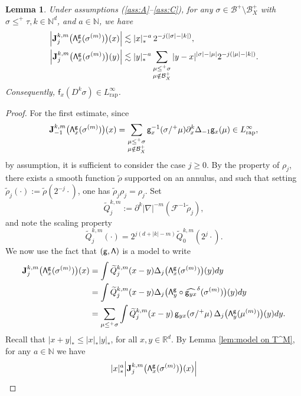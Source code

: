 \documentclass[10pt]{amsart}
\theoremstyle{plain}
\newtheorem{lem}[thm]{Lemma}
\theoremstyle{definition}
\newcommand{\rap}{\mathrm{rap}}
\newcommand{\bfJ}{\mathbf{J}}
\newcommand{\sff}{\mathsf{f}}
\newcommand{\sfg}{\mathsf{g}}
\newcommand{\bbN}{\mathbb{N}}
\newcommand{\bbR}{\mathbb{R}}
\newcommand{\mcB}{\mathcal{B}}
\newcommand{\mcF}{\mathcal{F}}
\begin{document}
\begin{lem} \label{lem:I_j^k}
Under assumptions \textup{(\ref{ass:A}--\ref{ass:C})}, for any $\sigma\in\mcB^+\setminus\mcB_X^+$ with $\sigma\le^+\tau, k\in\bbN^d$, and $a\in\bbN$, we have
\begin{align*}
\Big|\bfJ_j^{k,m}\bigl({\sf\Lambda}^{\sfg}_x(\sigma^{(m)})\bigr)(x)\Big| &\lesssim|x|_*^{-a}\,2^{-j(|\sigma|-|k|)}, \\
\Big|\bfJ_j^{k,m}\bigl({\sf\Lambda}^{\sfg}_x(\sigma^{(m)})\bigr)(y)\Big| &\lesssim|y|_*^{-a}\sum_{\substack{\mu\le^+\sigma\\\mu\notin\mcB_X^+}}|y-x|^{|\sigma|-|\mu|}2^{-j(|\mu|-|k|)}.
\end{align*}
Consequently, $\sff_x(D^k\sigma)\in L_\rap^\infty$.
\end{lem}

\begin{proof}
For the first estimate, since
\[
\bfJ_{-1}^{k,m}\bigl({\sf\Lambda}^{\sfg}_x(\sigma^{(m)})\bigr)(x) = \sum_{\substack{\mu\leq^+\sigma\\\mu\notin\mcB_X^+}}\sfg_x^{-1}(\sigma/^+\mu)\partial_x^k\Delta_{-1}\sfg_x(\mu) \in L_\rap^\infty,
\]
by assumption, it is sufficient to consider the case $j\ge0$. By the property of $\rho_j$, there exists a smooth function $\tilde\rho$ supported on an annulus, and such that setting $\tilde\rho_j(\cdot) := \tilde\rho(2^{-j}\cdot)$, one has $\widetilde{\rho}_j\rho_j=\rho_j$. Set
\[
\widetilde{Q}_j^{k,m} := \partial^k|\nabla|^{-m}(\mcF^{-1}\tilde{\rho}_j),
\]
and note the scaling property
\[
\widetilde{Q}_j^{k,m}(\cdot) = 2^{j(d+|k|-m)}\widetilde{Q}_0^{k,m}(2^j\cdot).
\]
We now use the fact that $\sf (g,\Lambda)$ is a model to write
\begin{align*}
\bfJ_j^{k,m}\bigl({\sf \Lambda}^{\sfg}_x(\sigma^{(m)})\bigr)(x)
&=\int \widetilde{Q}_j^{k,m}(x-y)\Delta_j\bigl({\sf\Lambda}^{\sfg}_x(\sigma^{(m)})\bigr)(y)dy \\
&=\int \widetilde{Q}_j^{k,m}(x-y)\Delta_j\bigl({\sf\Lambda}^{\sfg}_y\circ\widehat{\sfg_{yx}}^\delta(\sigma^{(m)})\bigr)(y)dy \\
&=\sum_{\mu\le^+\sigma} \int \widetilde{Q}_j^{k,m}(x-y)\,\sfg_{yx}(\sigma/^+\mu)\,\Delta_j\bigl({\sf\Lambda}^{\sfg}_y(\mu^{(m)})\bigr)(y)dy.
\end{align*}
Recall that $|x+y|_*\leq |x|_* |y|_*$, for all $x,y\in\bbR^d$. By Lemma \ref{lem:model on T^M}, for any $a\in\bbN$ we have
\begin{align*}
|x|_*^a\Big|\bfJ_j^{k,m}&\bigl({\sf\Lambda}^{\sfg}_x(\sigma^{(m)})\bigr)(x)\Big| \\

\end{align*}
\end{proof}
\end{document}
